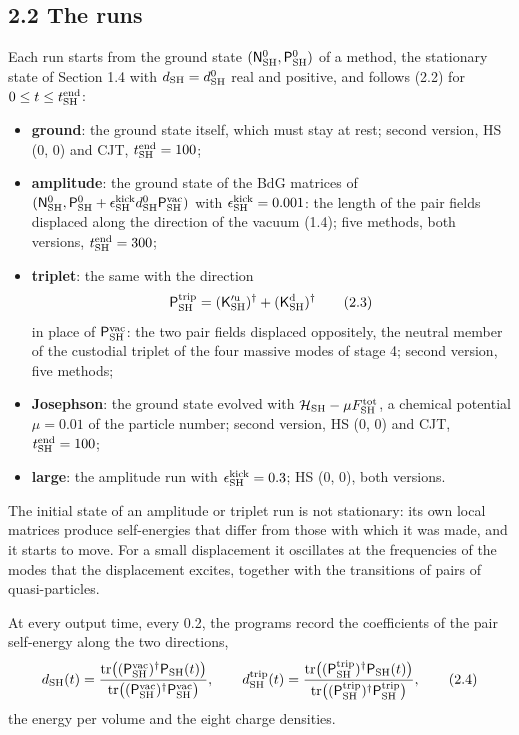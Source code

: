\documentclass[
  10pt,
]{article}
\providecommand{\tightlist}{%
  \setlength{\itemsep}{0pt}\setlength{\parskip}{0pt}}
\begin{document}
\hypertarget{the-runs}{%
\subsection{2.2 The runs}\label{the-runs}}

Each run starts from the ground state
\((\mathsf N^0_{\rm SH},\mathsf P^0_{\rm SH})\) of a method, the
stationary state of Section 1.4 with \(d_{\rm SH}=d^0_{\rm SH}\) real
and positive, and follows (2.2) for \(0\le t\le t^{\rm end}_{\rm SH}\):

\begin{itemize}
\tightlist
\item
  \textbf{ground}: the ground state itself, which must stay at rest;
  second version, HS (0, 0) and CJT, \(t^{\rm end}_{\rm SH}=100\);
\item
  \textbf{amplitude}: the ground state of the BdG matrices of
  \((\mathsf N^0_{\rm SH},\mathsf P^0_{\rm SH}+\epsilon^{\rm kick}_{\rm SH}d^0_{\rm SH}\mathsf P^{\rm vac}_{\rm SH})\)
  with \(\epsilon^{\rm kick}_{\rm SH}=0.001\): the length of the pair
  fields displaced along the direction of the vacuum (1.4); five
  methods, both versions, \(t^{\rm end}_{\rm SH}=300\);
\item
  \textbf{triplet}: the same with the direction
  \[\mathsf P^{\rm trip}_{\rm SH}=(\mathsf K'^{\rm u}_{\rm SH})^\dagger+(\mathsf K^{\rm d}_{\rm SH})^\dagger\tag{2.3}\]
  in place of \(\mathsf P^{\rm vac}_{\rm SH}\): the two pair fields
  displaced oppositely, the neutral member of the custodial triplet of
  the four massive modes of stage 4; second version, five methods;
\item
  \textbf{Josephson}: the ground state evolved with
  \(\mathcal H_{\rm SH}-\mu F^{\rm tot}_{\rm SH}\), a chemical potential
  \(\mu=0.01\) of the particle number; second version, HS (0, 0) and
  CJT, \(t^{\rm end}_{\rm SH}=100\);
\item
  \textbf{large}: the amplitude run with
  \(\epsilon^{\rm kick}_{\rm SH}=0.3\); HS (0, 0), both versions.
\end{itemize}

The initial state of an amplitude or triplet run is not stationary: its
own local matrices produce self-energies that differ from those with
which it was made, and it starts to move. For a small displacement it
oscillates at the frequencies of the modes that the displacement
excites, together with the transitions of pairs of quasi-particles.

At every output time, every 0.2, the programs record the coefficients of
the pair self-energy along the two directions,
\[d_{\rm SH}(t)=\frac{\mathrm{tr}\big((\mathsf P^{\rm vac}_{\rm SH})^\dagger\mathsf P_{\rm SH}(t)\big)}{\mathrm{tr}\big((\mathsf P^{\rm vac}_{\rm SH})^\dagger\mathsf P^{\rm vac}_{\rm SH}\big)},\qquad
d^{\rm trip}_{\rm SH}(t)=\frac{\mathrm{tr}\big((\mathsf P^{\rm trip}_{\rm SH})^\dagger\mathsf P_{\rm SH}(t)\big)}{\mathrm{tr}\big((\mathsf P^{\rm trip}_{\rm SH})^\dagger\mathsf P^{\rm trip}_{\rm SH}\big)},\tag{2.4}\]
the energy per volume and the eight charge densities.
\end{document}
